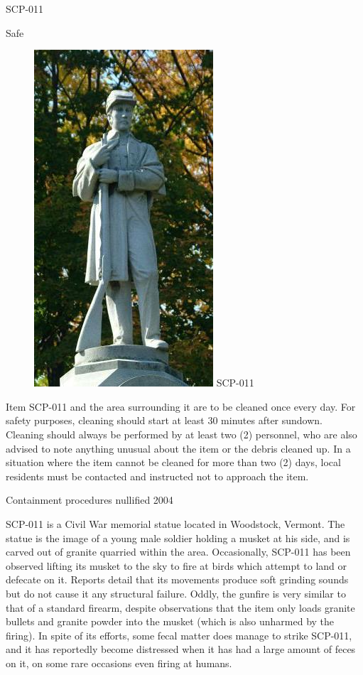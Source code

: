 
 SCP-011

 Safe

\begin{figure}[h]
\begin{center}
\includegraphics[scale=0.6]{scp/011.jpg}
\linebreak SCP-011
\end{center}
\end{figure}

 Item SCP-011 and the area surrounding it are to be cleaned once every day. For safety purposes, cleaning should start at least 30 minutes after sundown. Cleaning should always be performed by at least two (2) personnel, who are also advised to note anything unusual about the item or the debris cleaned up. In a situation where the item cannot be cleaned for more than two (2) days, local residents must be contacted and instructed not to approach the item.

\lb Containment procedures nullified 2004\rb

 SCP-011 is a Civil War memorial statue located in Woodstock, Vermont. The statue is the image of a young male soldier holding a musket at his side, and is carved out of granite quarried within the area. Occasionally, SCP-011 has been observed lifting its musket to the sky to fire at birds which attempt to land or defecate on it. Reports detail that its movements produce soft grinding sounds but do not cause it any structural failure. Oddly, the gunfire is very similar to that of a standard firearm, despite observations that the item only loads granite bullets and granite powder into the musket (which is also unharmed by the firing). In spite of its efforts, some fecal matter does manage to strike SCP-011, and it has reportedly become distressed when it has had a large amount of feces on it, on some rare occasions even firing at humans.

